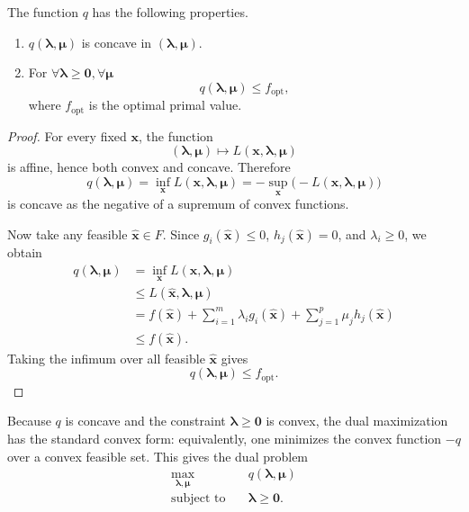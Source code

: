 \begin{claim}
\label{clm:ch8-dual-properties}
The function $q$ has the following properties.
\begin{enumerate}
  \item $q(\boldsymbol{\lambda},\boldsymbol{\mu})$ is concave in
  $(\boldsymbol{\lambda},\boldsymbol{\mu})$.
  \item For $ \forall \boldsymbol{\lambda}\ge \mathbf{0}, 
    \forall\boldsymbol{\mu}$
  \[
    q(\boldsymbol{\lambda},\boldsymbol{\mu}) \le f_{\mathrm{opt}},
  \]
  where $f_{\mathrm{opt}}$ is the optimal primal value.
\end{enumerate}
\end{claim}
\begin{proof}
For every fixed $\mathbf{x}$, the function
\[
  (\boldsymbol{\lambda},\boldsymbol{\mu})
  \mapsto
  L(\mathbf{x},\boldsymbol{\lambda},\boldsymbol{\mu})
\]
is affine, hence both convex and concave. Therefore
\[
  q(\boldsymbol{\lambda},\boldsymbol{\mu})
  =
  \inf_{\mathbf{x}} L(\mathbf{x},\boldsymbol{\lambda},\boldsymbol{\mu})
  =
  -\sup_{\mathbf{x}}
  \bigl(-L(\mathbf{x},\boldsymbol{\lambda},\boldsymbol{\mu})\bigr)
\]
is concave as the negative of a supremum of convex functions.

Now take any feasible $\widehat{\mathbf{x}}\in F$. Since
$g_i(\widehat{\mathbf{x}})\le 0$, $h_j(\widehat{\mathbf{x}})=0$, and
$\lambda_i\ge 0$, we obtain
\begin{align*}
  q(\boldsymbol{\lambda},\boldsymbol{\mu})
  &=
  \inf_{\mathbf{x}} L(\mathbf{x},\boldsymbol{\lambda},\boldsymbol{\mu}) \\
  &\le
  L(\widehat{\mathbf{x}},\boldsymbol{\lambda},\boldsymbol{\mu}) \\
  &=
  f(\widehat{\mathbf{x}})
  + \sum_{i=1}^m \lambda_i g_i(\widehat{\mathbf{x}})
  + \sum_{j=1}^p \mu_j h_j(\widehat{\mathbf{x}}) \\
  &\le f(\widehat{\mathbf{x}}).
\end{align*}
Taking the infimum over all feasible $\widehat{\mathbf{x}}$ gives
\[
  q(\boldsymbol{\lambda},\boldsymbol{\mu}) \le f_{\mathrm{opt}}.
\]
\end{proof}

Because $q$ is concave and the constraint
$\boldsymbol{\lambda}\ge \mathbf{0}$ is convex, the dual maximization has the
standard convex form: equivalently, one minimizes the convex function $-q$ over
a convex feasible set. This gives the dual problem
\begin{equation}
  \label{eq:ch8-dual-problem}
  \begin{aligned}
    \max_{\boldsymbol{\lambda},\boldsymbol{\mu}} \quad
    & q(\boldsymbol{\lambda},\boldsymbol{\mu}) \\
    \text{subject to}\quad
    & \boldsymbol{\lambda}\ge \mathbf{0}.
  \end{aligned}
\end{equation}

